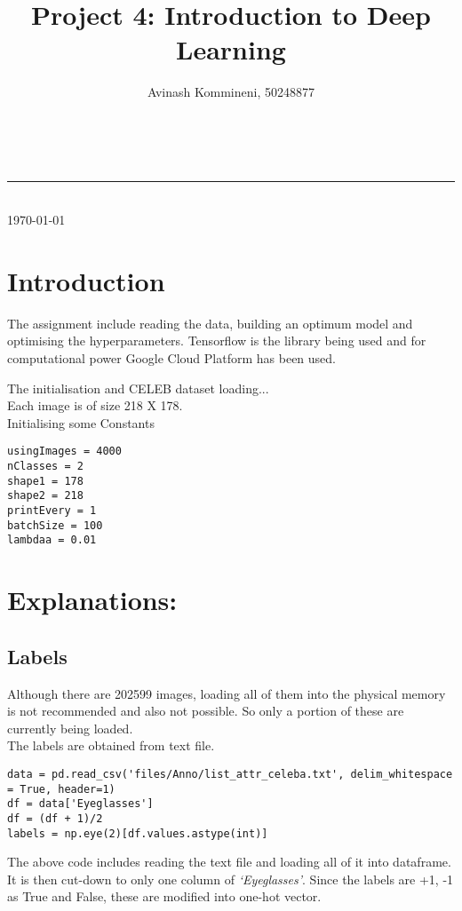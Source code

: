 \documentclass[a4paper,11pt]{article}
\makeatletter
\newcommand{\linia}{\rule{\linewidth}{0.5pt}}
\renewcommand{\maketitle}{
\begin{center}
\vspace{2ex}
{\LARGE \textsc{\@title}}
\vspace{1ex}
\\
\linia\\
\@author \hfill \today
\vspace{4ex}
\end{center}
}
\makeatother
\begin{document}
\title{Project 4: Introduction to Deep Learning}

\author{Avinash Kommineni, 50248877} 


\maketitle

\section{Introduction}

The assignment include reading the data, building an optimum model and optimising the hyperparameters. Tensorflow is the library being used  and for computational power Google Cloud Platform has been used.

The initialisation and CELEB dataset loading...\\
Each image is of size 218 X 178.\\
Initialising some Constants
\begin{lstlisting}[label={list:second}]
usingImages = 4000
nClasses = 2
shape1 = 178
shape2 = 218
printEvery = 1
batchSize = 100
lambdaa = 0.01
\end{lstlisting}



\section{Explanations:}
\subsection*{Labels}
Although there are 202599 images, loading all of them into the physical memory is not recommended and also not possible. So only a portion of these are currently being loaded. \\
The labels are obtained from text file.
\begin{lstlisting}[label={list:first}]
data = pd.read_csv('files/Anno/list_attr_celeba.txt', delim_whitespace = True, header=1)
df = data['Eyeglasses']
df = (df + 1)/2
labels = np.eye(2)[df.values.astype(int)]
\end{lstlisting}

The above code includes reading the text file and loading all of it into dataframe. It is then cut-down to only one column of \textit{`Eyeglasses'}. Since the labels are +1, -1 as True and False, these are modified into one-hot vector.
\end{document}
